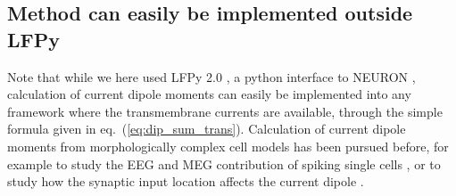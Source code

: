 \documentclass[preprint,10pt,authoryear]{elsarticle}
\newcommand{\gex}[1]{{\color{Orange}#1}}
\begin{document}

\gex{\subsection{Method can easily be implemented outside LFPy}}
Note that while we here used LFPy 2.0 \citep{HAGEN2018, HAGEN2019}, a python interface to NEURON \citep{CARNEVALE2006}, calculation of current dipole moments can easily be implemented into any framework where the transmembrane currents are available, through the simple formula given in eq.~(\ref{eq:dip_sum_trans}). 
Calculation of current dipole moments from morphologically complex cell models has been pursued before, for example to study the EEG and MEG contribution of spiking single cells \citep{Murakami2006}, or to study how the synaptic input location affects the current dipole \citep{LINDEN2010, AHLFORS2015}.
\end{document}
